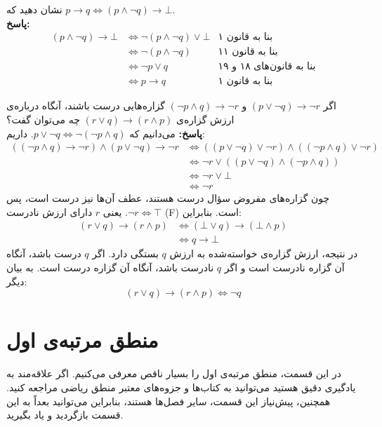 \begin{example}
	نشان دهید که
	$p \rightarrow q \iff (p \wedge \neg q) \rightarrow \bot$.
	\\ \textbf{پاسخ:}
	\begin{align*}
		(p \wedge \neg q) \rightarrow \bot &\iff \neg(p \wedge \neg q) \vee \bot &\text{بنا به قانون ۱} \\
		&\iff \neg(p \wedge \neg q) &\text{بنا به قانون ۱۱} \\
		&\iff \neg p \vee q &\text{بنا به قانون‌های ۱۸ و ۱۹} \\
		&\iff p \rightarrow q &\text{بنا به قانون ۱}
	\end{align*}
\end{example}
\begin{example}
	اگر
	$(p \vee \neg q) \rightarrow \neg r$ و $(\neg p \wedge q) \rightarrow \neg r$
	گزاره‌هایی درست باشند، آنگاه درباره‌ی ارزش گزاره‌ی
	$(r \vee q) \rightarrow (r \wedge p)$
	چه می‌توان گفت؟
	\\ \textbf{پاسخ:}
	می‌دانیم که
	$p \vee \neg q \iff \neg (\neg p \wedge q)$.
	داریم:
	\begin{align*}
		((\neg p \wedge q) \rightarrow \neg r) \wedge (p \vee \neg q) \rightarrow \neg r
		&\iff ((p \vee \neg q) \vee \neg r) \wedge ((\neg p \wedge q) \vee \neg r) \\
		&\iff \neg r \vee ((p \vee \neg q) \wedge (\neg p \wedge q)) \\
		&\iff \neg r \vee \bot \\
		&\iff \neg r
	\end{align*}
	چون گزاره‌های مفروض سؤال درست هستند، عطف آن‌ها نیز درست است، پس
	$\neg r \iff \top$.
	یعنی $r$ دارای ارزش نادرست (F) است. بنابراین:
	\begin{align*}
		(r \vee q) \rightarrow (r \wedge p)
		&\iff (\bot \vee q) \rightarrow (\bot \wedge p) \\
		&\iff q \rightarrow \bot
	\end{align*}
	در نتیجه، ارزش گزاره‌ی خواسته‌شده به ارزش $q$ بستگی دارد. اگر $q$ درست باشد، آنگاه آن گزاره نادرست است و اگر $q$ نادرست باشد، آنگاه آن گزاره درست است. به بیان دیگر:
	$$(r \vee q) \rightarrow (r \wedge p) \iff \neg q$$
\end{example}

\section{منطق مرتبه‌ی اول}
در این قسمت، منطق مرتبه‌ی اول را بسیار ناقص معرفی می‌کنیم. اگر علاقه‌مند به یادگیری دقیق هستید می‌توانید به کتاب‌ها و جزوه‌های معتبر منطق ریاضی مراجعه کنید. همچنین، پیش‌نیاز این قسمت، سایر فصل‌ها هستند، بنابراین می‌توانید بعداً به این قسمت بازگردید و یاد بگیرید.


